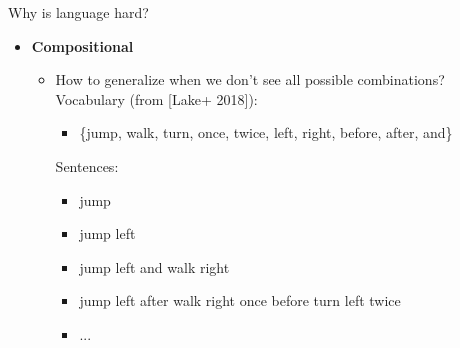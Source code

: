 \documentclass[usenames,dvipsnames,notes]{beamer}
\begin{document}
\begin{frame}
    {Why is language hard?}
    \begin{itemize}
        \itemsep1em
        \item \textbf{Compositional}
            \begin{itemize}
                \item How to generalize when we don't see all possible combinations?\\
                    \medskip
                Vocabulary (from [Lake+ 2018]):\\
                    \begin{itemize}
                    \item[]\{jump, walk, turn, once, twice, left, right, before, after, and\}
                    \end{itemize}
                Sentences: \\
                    \begin{itemize}
                       \item[]jump \\
                       \item[]jump left\\
                       \item[]jump left and walk right \\
                       \item[]jump left after walk right once before turn left twice\\
                       \item[]...
                    \end{itemize}
            \end{itemize}
    \end{itemize}
\end{frame}
\end{document}
